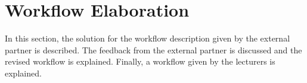 \section{Workflow Elaboration \label{sec:WorkflowElaboration}}
In this section, the solution for the workflow description given by the external partner is described. The feedback from the external partner is discussed and the revised workflow is explained. Finally, a workflow given by the lecturers is explained.






